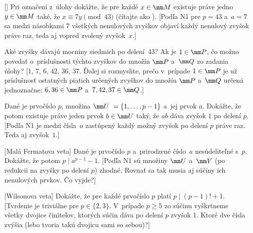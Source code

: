 {[] Pri označení z~úlohy
dokážte, že pre každé $x \in \mm M$ existuje práve jedno $y \in \mm M$ také,
že $x \equiv 7y \pmod{43}$ (čítajte ako ).
[Podľa N1 pre $p=43$ a~$a=7$ sa medzi násobkami 7 všetkých nenulových zvyškov objaví
každý nenulový zvyšok práve raz, teda aj vopred zvolený zvyšok~$x$.]

Aké zvyšky dávajú mocniny siedmich po delení~43? Ak je $1 \in\mm P$,
čo možno povedať o~príslušnosti týchto zvyškov do množín $\mm P$ a~$\mm Q$ zo
zadania úlohy?
[1, 7, 6, 42, 36, 37. Ďalej si rozmyslite, prečo v~prípade
$1\in\mm P$ je už príslušnosť ostatných piatich určených zvyškov do
množín $\mm P$ a~$\mm Q$ určená jednoznačne: $6, 36\in\mm P$
a~$7, 42, 37\in\mm Q$.]

\D
Dané je prvočíslo $p$, množina $\mm U~= \{1, \dots, p-1\}$
a~jej prvok $a$. Dokážte, že potom existuje práve jeden prvok
$b\in \mm U$ taký, že $ab$ dáva zvyšok $1$ po delení $p$.
[Podľa N1 je medzi  čísla~$a$ zastúpený každý možný zvyšok
po delení $p$ práve raz. Teda aj zvyšok~$1$.]

[Malá Fermatova veta] Dané je prvočíslo $p$ a~prirodzené číslo~$a$ nesúdeliteľné s~$p$.
Dokážte, že potom $p \mid a^{p-1} - 1$.
[Podľa N1 sú množiny $\mm U$ a~$\mm V$ (po redukcii na zvyšky po
delení $p$) zhodné. Rovnať sa tak musia aj súčiny ich nenulových
prvkov. Čo vyjde?]

[Wilsonova veta] Dokážte, že pre každé prvočíslo $p$ platí $p\mid (p-1)! + 1$.
[Tvrdenie je triviálne pre $p\in\{2, 3\}$. V~prípade $p\ge5$
zo súčinu vyškrtneme všetky dvojice činiteľov, ktorých súčin dáva
po delení $p$ zvyšok 1. Ktoré dve čísla zvýšia (lebo tvoria
takú dvojicu sami so sebou)?]
}

